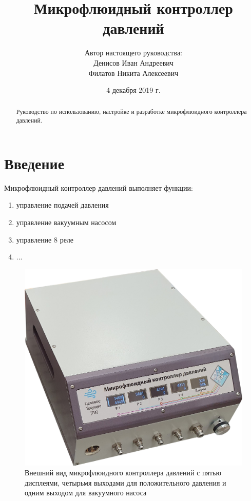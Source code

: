 \documentclass[twoside, 12pt, a4paper]{refart}
\title{Микрофлюидный контроллер давлений}
\author{
Автор настоящего руководства: \\
Денисов Иван Андреевич \\
Филатов Никита Алексеевич \\
}
\date{4 декабря 2019 г.}
\begin{document}
\maketitle

\begin{abstract}
Руководство по использованию, настройке и разработке микрофлюидного контроллера давлений.
\end{abstract}

\tableofcontents

\newpage



\section{Введение}
\label{intro}

Микрофлюидный контроллер давлений выполняет функции:
\begin{enumerate}

\item управление подачей давления
    
\item управление вакуумным насосом

\item управление 8 реле

\item ...
        
\end{enumerate}

\begin{figure}[h!b]
	\begin{center}
	\includegraphics[width=\textwidth]{imgs/device.jpg}
	\caption{Внешний вид микрофлюидного контроллера давлений с пятью дисплеями, четырьмя выходами для положительного давления и одним выходом для вакуумного насоса}
	\label{fig:device}
	\end{center}
\end{figure}
\end{document}

